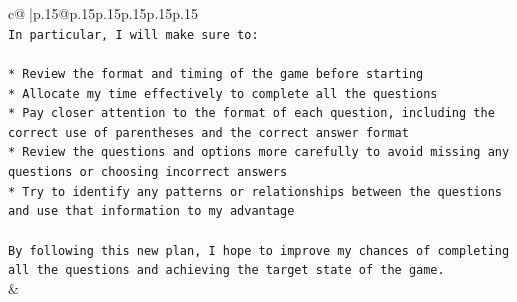 \documentclass{article}
\begin{document}
{\begin{supertabular}{c@{$\;$}|p{.15\linewidth}@{}p{.15\linewidth}p{.15\linewidth}p{.15\linewidth}p{.15\linewidth}p{.15\linewidth}}
{{{\\ 
\texttt{In particular, I will make sure to:} \\
\\ 
\texttt{* Review the format and timing of the game before starting} \\
\texttt{* Allocate my time effectively to complete all the questions} \\
\texttt{* Pay closer attention to the format of each question, including the correct use of parentheses and the correct answer format} \\
\texttt{* Review the questions and options more carefully to avoid missing any questions or choosing incorrect answers} \\
\texttt{* Try to identify any patterns or relationships between the questions and use that information to my advantage} \\
\\ 
\texttt{By following this new plan, I hope to improve my chances of completing all the questions and achieving the target state of the game.} \\
            }
        }
    }
    & \\ \\

\end{supertabular}
}
\end{document}
